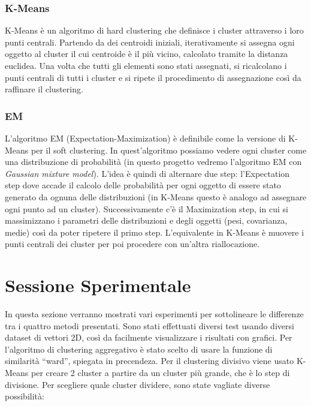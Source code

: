 \documentclass{llncs}
\begin{document}
	\subsubsection{K-Means}
	K-Means è un algoritmo di hard clustering che definisce i cluster attraverso i loro punti centrali.
	Partendo da dei centroidi iniziali, iterativamente si assegna ogni oggetto al cluster il cui centroide è
	il più vicino, calcolato tramite la distanza euclidea. Una volta che tutti gli elementi sono stati assegnati, si ricalcolano i punti centrali di tutti
	i cluster e si ripete il procedimento di assegnazione così da raffinare il clustering.

	\subsubsection{EM}
	L'algoritmo EM (Expectation-Maximization) è definibile come la versione di K-Means per il soft clustering.
	In quest'algoritmo possiamo vedere ogni cluster come una distribuzione di probabilità (in questo progetto vedremo l'algoritmo EM con \textit{Gaussian mixture model}).
	L'idea è quindi di alternare due step: l'Expectation step dove accade il calcolo delle probabilità per ogni oggetto di essere stato generato da ognuna delle distribuzioni 
	(in K-Means questo è analogo ad assegnare ogni punto ad un cluster). 
	Successivamente c'è il Maximization step, in cui si massimizzano i parametri delle distribuzioni e degli oggetti (pesi, covarianza, medie) così da poter ripetere il primo step. 
	L'equivalente in K-Means è muovere i punti centrali dei cluster per poi procedere con un'altra riallocazione.

	\section{Sessione Sperimentale}
	In questa sezione verranno mostrati vari esperimenti per sottolineare le differenze tra i quattro metodi presentati. Sono stati effettuati diversi test usando diversi dataset di vettori 2D, così da 
	facilmente visualizzare i risultati con grafici. Per l'algoritmo di clustering aggregativo è stato scelto di usare la funzione di similarità ``ward'', spiegata in precendeza. Per il clustering
	divisivo viene usato K-Means per creare 2 cluster a partire da un cluster più grande, che è lo step di divisione. Per scegliere quale cluster dividere, sono state vagliate diverse possibilità:
	
\end{document}
